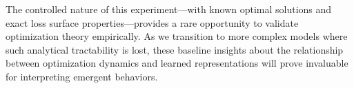 The controlled nature of this experiment—with known optimal solutions and exact loss surface properties—provides a rare opportunity to validate optimization theory empirically. As we transition to more complex models where such analytical tractability is lost, these baseline insights about the relationship between optimization dynamics and learned representations will prove invaluable for interpreting emergent behaviors.